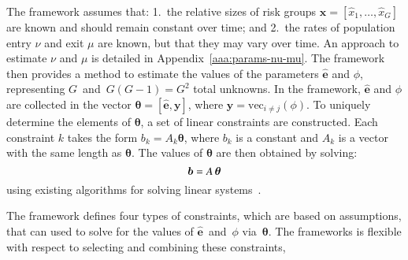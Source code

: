 \par
The framework assumes that:
1.~the relative sizes of risk groups
$\bm{\hat{x}} = [\hat{x}_1, \dots, \hat{x}_G]$
are known and should remain constant over time; and
2.~the rates of population entry $\nu$ and exit $\mu$
are known, but that they may vary over time.
An approach to estimate $\nu$ and $\mu$ is detailed in Appendix~\ref{aaa:params-nu-mu}.
The framework then provides a method to estimate
the values of the parameters $\bm{\hat{e}}$ and $\phi$,
representing $G$~and~$G(G-1) = G^2$ total unknowns.
In the framework,
$\bm{\hat{e}}$ and $\phi$ are collected in the vector
$\bm{\theta} = \left[\bm{\hat{e}}, \bm{y}\right]$,
where $\bm{y} = \mathrm{vec}_{i \ne j}(\phi)$.
To uniquely determine the elements of $\bm{\theta}$,
a set of linear constraints are constructed.
Each constraint $k$ takes the form
$b_k = A_k \bm{\theta}$,
where $b_k$ is a constant and $A_k$ is a vector with the same length as $\bm{\theta}$.
The values of $\bm{\theta}$ are then obtained by solving:
\begin{equation}\label{eq:system-matrix}
\bm{b} = A \thinspace \bm{\theta}
\end{equation}
using existing algorithms for solving linear systems~\citep{LAPACK}.
\par
The framework defines four types of constraints, which are based on assumptions,
that can used to solve for the values of
$\bm{\hat{e}}$~and~$\phi$ via~$\bm{\theta}$.
The frameworks is flexible with respect to
selecting and combining these constraints,

